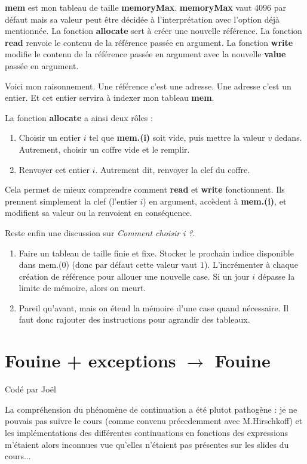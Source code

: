 \documentclass[a4paper,10pt]{report}
\begin{document}
\textbf{mem} est mon tableau de taille \textbf{memoryMax}. \textbf{memoryMax} vaut 4096 par défaut mais sa valeur peut être décidée à l'interprétation avec l'option déjà mentionnée. La fonction \textbf{allocate} sert à créer une nouvelle référence. La fonction \textbf{read} renvoie le contenu de la référence passée en argument. La fonction \textbf{write} modifie le contenu de la référence passée en argument avec la nouvelle \textbf{value} passée en argument.
  
Voici mon raisonnement. Une référence c'est une adresse. Une adresse c'est un entier. Et cet entier servira à indexer mon tableau \textbf{mem}.  
  
La fonction \textbf{allocate} a ainsi deux rôles :

\begin{enumerate}
\item Choisir un entier $i$ tel que \textbf{mem.(i)} soit vide, puis mettre la valeur $v$ dedans. Autrement, choisir un coffre vide et le remplir.  
\item Renvoyer cet entier $i$. Autrement dit, renvoyer la clef du coffre.  
\end{enumerate}

Cela permet de mieux comprendre comment \textbf{read} et \textbf{write} fonctionnent. Ils prennent simplement la clef (l'entier $i$) en argument, accèdent à \textbf{mem.(i)}, et modifient sa valeur ou la renvoient en conséquence.  
  
Reste enfin une discussion sur \textit{Comment choisir i ?}.  

\begin{enumerate}
\item Faire un tableau de taille finie et fixe. Stocker le prochain indice disponible dans mem.(0) (donc par défaut cette valeur vaut $1$). L'incrémenter à chaque création de référence pour allouer une nouvelle case. Si un jour $i$ dépasse la limite de mémoire, alors on meurt.
\item Pareil qu'avant, mais on étend la mémoire d'une case quand nécessaire. Il faut donc rajouter des instructions pour agrandir des tableaux. 
\end{enumerate}

\section{Fouine + exceptions $\rightarrow$ Fouine}
Codé par Joël

La compréhension du phénomène de continuation a été plutot pathogène : je ne pouvais pas suivre le cours (comme convenu précedemment avec M.Hirschkoff) et les implémentations des différentes continuations en fonctions des expressions m'étaient alors inconnues vue qu'elles n'étaient pas présentes sur les slides du cours...
\end{document}
